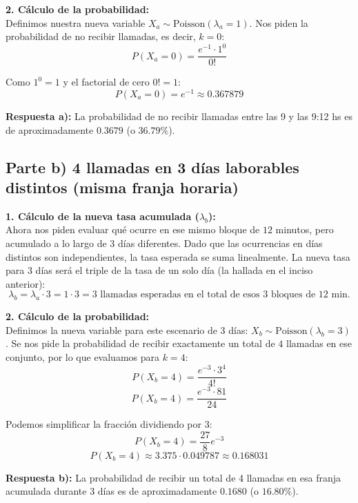 \documentclass[11pt, a4paper]{article}
\begin{document}
\textbf{2. Cálculo de la probabilidad:} \\
Definimos nuestra nueva variable $X_a \sim \text{Poisson}(\lambda_a = 1)$. 
Nos piden la probabilidad de no recibir llamadas, es decir, $k = 0$:
\[ P(X_a = 0) = \frac{e^{-1} \cdot 1^0}{0!} \]

Como $1^0 = 1$ y el factorial de cero $0! = 1$:
\[ P(X_a = 0) = e^{-1} \approx 0.367879 \]

\textbf{Respuesta a):} La probabilidad de no recibir llamadas entre las 9 y las 9:12 hs es de aproximadamente $0.3679$ (o $36.79\%$).

\vspace{0.5cm}

\subsection*{Parte b) 4 llamadas en 3 días laborables distintos (misma franja horaria)}

\textbf{1. Cálculo de la nueva tasa acumulada ($\lambda_b$):} \\
Ahora nos piden evaluar qué ocurre en ese mismo bloque de $12$ minutos, pero acumulado a lo largo de $3$ días diferentes. Dado que las ocurrencias en días distintos son independientes, la tasa esperada se suma linealmente.
La nueva tasa para $3$ días será el triple de la tasa de un solo día (la hallada en el inciso anterior):
\[ \lambda_b = \lambda_a \cdot 3 = 1 \cdot 3 = 3 \text{ llamadas esperadas en el total de esos } 3 \text{ bloques de } 12 \text{ min.} \]

\textbf{2. Cálculo de la probabilidad:} \\
Definimos la nueva variable para este escenario de 3 días: $X_b \sim \text{Poisson}(\lambda_b = 3)$. 
Se nos pide la probabilidad de recibir exactamente un total de $4$ llamadas en ese conjunto, por lo que evaluamos para $k = 4$:
\[ P(X_b = 4) = \frac{e^{-3} \cdot 3^4}{4!} \]
\[ P(X_b = 4) = \frac{e^{-3} \cdot 81}{24} \]

Podemos simplificar la fracción dividiendo por $3$:
\[ P(X_b = 4) = \frac{27}{8} e^{-3} \]
\[ P(X_b = 4) \approx 3.375 \cdot 0.049787 \approx 0.168031 \]

\textbf{Respuesta b):} La probabilidad de recibir un total de 4 llamadas en esa franja acumulada durante 3 días es de aproximadamente $0.1680$ (o $16.80\%$).
\end{document}
